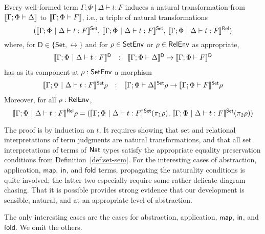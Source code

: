 \documentclass{lmcs}
\theoremstyle{plain}\newtheorem{satz}[thm]{Satz}
\newcommand{\fold}{\mathsf{fold}}
\newcommand{\set}{\mathsf{Set}}
\newcommand{\map}{\mathsf{map}}
\begin{document}
{\begin{thm}\label{thm:at-gen}
Every well-formed term $\Gamma;\Phi~|~\Delta \vdash t : F$ induces
a natural transformation from $\llbracket{\Gamma; \Phi \vdash \Delta}\rrbracket$ to
$\llbracket{\Gamma; \Phi \vdash F}\rrbracket$, i.e., a triple of natural
transformations 
\[(\setsem{\Gamma;\Phi~|~\Delta \vdash t : F},\,
\setsem{\Gamma;\Phi~|~\Delta \vdash t : F},\,
\relsem{\Gamma;\Phi~|~\Delta \vdash t : F})\]
where, for $\mathsf{D} \in \{\set,\rel\}$ and for $\rho \in \mathsf{SetEnv}$
or $\rho \in \mathsf{RelEnv}$ as appropriate,
\[\begin{array}{lll}
\llbracket{\Gamma;\Phi~|~\Delta \vdash t : F}\rrbracket^{\mathsf D} & : & \llbracket{\Gamma;
  \Phi \vdash \Delta}\rrbracket^{\mathsf D} \to \llbracket{\Gamma; \Phi \vdash F}\rrbracket^{\mathsf D}
\end{array}\]
has as its component at $\rho : \mathsf{SetEnv}$ a morphism
\[\begin{array}{lll}
\setsem{\Gamma;\Phi~|~\Delta \vdash t : F}\rho & : & \setsem{\Gamma;
  \Phi \vdash \Delta}\rho \to \setsem{\Gamma; \Phi \vdash F}\rho
\end{array}\]
Moreover, for all $\rho : \mathsf{RelEnv}$, 
\begin{equation}\label{eq:projs}
\relsem{\Gamma;\Phi~|~\Delta \vdash t : F}\rho =
(\setsem{\Gamma;\Phi~|~\Delta \vdash t : F}(\pi_1 \rho),\,
\setsem{\Gamma;\Phi~|~\Delta \vdash t : F}(\pi_2 \rho))
\end{equation}
\end{thm}
\proof The proof is by induction on $t$. It requires showing that set
and relational interpretations of term judgments are natural
transformations, and that all set interpretations of terms of $\mathsf{Nat}$
types satisfy the appropriate equality preservation conditions from
Definition~\ref{def:set-sem}.  For the interesting cases of
abstraction, application, $\map$, $\mathsf{in}$, and $\mathsf{fold}$ terms,
propagating the naturality conditions is quite involved; the latter
two especially require some rather delicate diagram chasing. That it
is possible provides strong evidence that our development is sensible,
natural, and at an appropriate level of abstraction.

The only interesting cases are the cases for abstraction, application,
$\map$, $\mathsf{in}$, and $\fold$. We omit the others.

}
\end{document}
